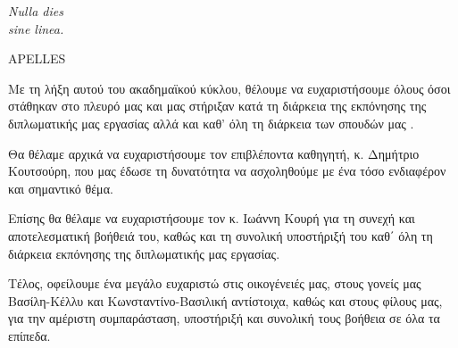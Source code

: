 \clearpage

\thispagestyle{empty}
\null\vfill

\settowidth{}
\begin{center}
	\parbox{\longest}{%
	  \raggedright{\huge\itshape%
	   Nulla dies\\ sine linea.\par\bigskip
	  }   
	  \raggedleft\Large\MakeUppercase{Apelles}\par%
	}
\end{center}
\vfill\vfill

\clearpage


\begin{acknowledgementsgr}
Με τη λήξη αυτού του ακαδημαϊκού κύκλου, θέλουμε να ευχαριστήσουμε όλους όσοι στάθηκαν στο πλευρό μας και μας στήριξαν κατά τη διάρκεια της εκπόνησης της διπλωματικής μας εργασίας αλλά και καθ’ όλη τη διάρκεια των σπουδών μας .

Θα θέλαμε αρχικά να ευχαριστήσουμε τον επιβλέποντα καθηγητή, κ. Δημήτριο Κουτσούρη, που μας έδωσε τη δυνατότητα να ασχοληθούμε με ένα τόσο ενδιαφέρον και σημαντικό θέμα.

Επίσης θα θέλαμε να ευχαριστήσουμε τον κ. Ιωάννη Κουρή για τη συνεχή και αποτελεσματική βοήθειά του, καθώς και τη συνολική υποστήριξή του καθ΄ όλη τη διάρκεια εκπόνησης της διπλωματικής μας εργασίας.

Τέλος, οφείλουμε ένα μεγάλο ευχαριστώ στις οικογένειές μας, στους γονείς μας Βασίλη-Κέλλυ και Κωνσταντίνο-Βασιλική αντίστοιχα, καθώς και στους φίλους μας, για την αμέριστη συμπαράσταση, υποστήριξή και συνολική τους βοήθεια σε όλα τα επίπεδα.
\end{acknowledgementsgr}

